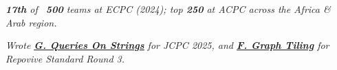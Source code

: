 


 \break
\textit{\textbf{17th} of ~\textbf{500} teams at ECPC (2024); top \textbf{250} at ACPC across the Africa \& Arab region.}

\vspace{1mm}

 \break
\textit{Wrote \href{https://codeforces.com/group/Rilx5irOux/contest/638270/problem/G}{\underline{\textbf{G. Queries On Strings}}} for JCPC 2025, and \href{https://repovive.com/contests/8/problems/F}{\underline{\textbf{F. Graph Tiling}}} for Repovive Standard Round 3.}

